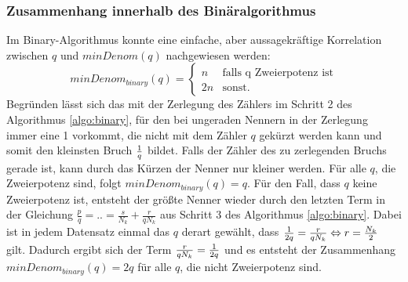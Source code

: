 
\subsubsection{Zusammenhang innerhalb des Binäralgorithmus}\label{subsubsec:ZsmHangBinary}
Im Binary-Algorithmus konnte eine einfache, aber aussagekräftige Korrelation zwischen $q$ und $minDenom(q)$ nachgewiesen werden:
\begin{equation*}
	minDenom_{binary}(q) = 
	\begin{cases}
		n & \text{falls q Zweierpotenz ist} \\
		2n & \text{sonst.}
	\end{cases}
\end{equation*}
Begründen lässt sich das mit der Zerlegung des Zählers im Schritt 2 des Algorithmus \ref{algo:binary}, für den bei ungeraden Nennern in der Zerlegung immer eine 1 vorkommt, die nicht mit dem Zähler $q$ gekürzt werden kann und somit den kleinsten Bruch $\frac{1}{q}$ bildet. Falls der Zähler des zu zerlegenden Bruchs gerade ist, kann durch das Kürzen der Nenner nur kleiner werden. Für alle $q$, die Zweierpotenz sind, folgt $minDenom_{binary}(q) = q$. Für den Fall, dass $q$ keine Zweierpotenz ist, entsteht der größte Nenner wieder durch den letzten Term in der Gleichung $\frac{p}{q} = .. = \frac{s}{N_k}+\frac{r}{qN_k}$ aus Schritt 3 des Algorithmus \ref{algo:binary}. Dabei ist in jedem Datensatz einmal das $q$ derart gewählt, dass $\frac{1}{2q} = \frac{r}{qN_k} \Leftrightarrow r = \frac{N_k}{2}$ gilt. Dadurch ergibt sich der Term $\frac{r}{qN_k} = \frac{1}{2q}$ und es entsteht der Zusammenhang $minDenom_{binary}(q) = 2q$ für alle $q$, die nicht Zweierpotenz sind.

